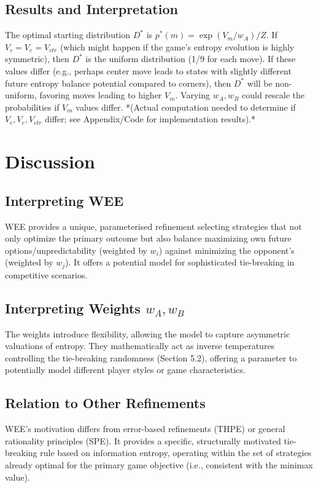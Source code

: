 \documentclass{article}
\begin{document}
\subsection{Results and Interpretation}
The optimal starting distribution $D^*$ is $p^*(m) = \exp(V_m / w_A) / Z$. If $V_c = V_e = V_{ctr}$ (which might happen if the game's entropy evolution is highly symmetric), then $D^*$ is the uniform distribution (1/9 for each move). If these values differ (e.g., perhaps center move leads to states with slightly different future entropy balance potential compared to corners), then $D^*$ will be non-uniform, favoring moves leading to higher $V_m$. Varying $w_A, w_B$ could rescale the probabilities if $V_m$ values differ. *(Actual computation needed to determine if $V_c, V_e, V_{ctr}$ differ; see Appendix/Code \cite{placeholder_repo} for implementation results).*

\section{Discussion}

\subsection{Interpreting WEE}
WEE provides a unique, parameterised refinement selecting strategies that not only optimize the primary outcome but also balance maximizing own future options/unpredictability (weighted by $w_i$) against minimizing the opponent's (weighted by $w_j$). It offers a potential model for sophisticated tie-breaking in competitive scenarios.

\subsection{Interpreting Weights \texorpdfstring{$w_A, w_B$}{wA, wB}}
The weights introduce flexibility, allowing the model to capture asymmetric valuations of entropy. They mathematically act as inverse temperatures controlling the tie-breaking randomness (Section 5.2), offering a parameter to potentially model different player styles or game characteristics.

\subsection{Relation to Other Refinements}
WEE's motivation differs from error-based refinements (THPE) or general rationality principles (SPE). It provides a specific, structurally motivated tie-breaking rule based on information entropy, operating within the set of strategies already optimal for the primary game objective (i.e., consistent with the minimax value).
\end{document}
